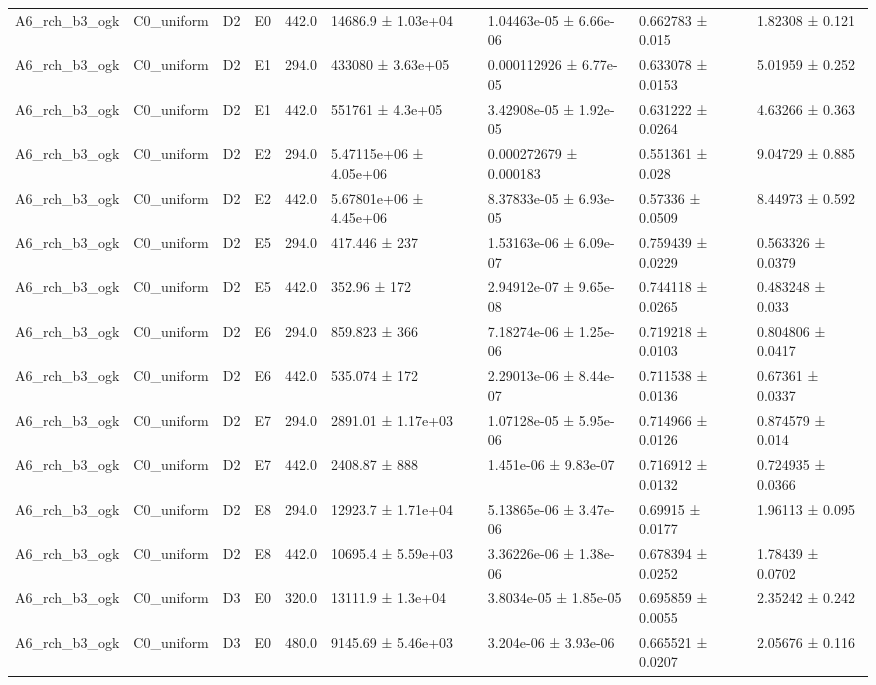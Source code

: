 \begin{table}
\begin{tabular}{lllllllll}
A6\_rch\_b3\_ogk & C0\_uniform & D2 & E0 & 442.0 & 14686.9 ± 1.03e+04 & 1.04463e-05 ± 6.66e-06 & 0.662783 ± 0.015 & 1.82308 ± 0.121 \\
A6\_rch\_b3\_ogk & C0\_uniform & D2 & E1 & 294.0 & 433080 ± 3.63e+05 & 0.000112926 ± 6.77e-05 & 0.633078 ± 0.0153 & 5.01959 ± 0.252 \\
A6\_rch\_b3\_ogk & C0\_uniform & D2 & E1 & 442.0 & 551761 ± 4.3e+05 & 3.42908e-05 ± 1.92e-05 & 0.631222 ± 0.0264 & 4.63266 ± 0.363 \\
A6\_rch\_b3\_ogk & C0\_uniform & D2 & E2 & 294.0 & 5.47115e+06 ± 4.05e+06 & 0.000272679 ± 0.000183 & 0.551361 ± 0.028 & 9.04729 ± 0.885 \\
A6\_rch\_b3\_ogk & C0\_uniform & D2 & E2 & 442.0 & 5.67801e+06 ± 4.45e+06 & 8.37833e-05 ± 6.93e-05 & 0.57336 ± 0.0509 & 8.44973 ± 0.592 \\
A6\_rch\_b3\_ogk & C0\_uniform & D2 & E5 & 294.0 & 417.446 ± 237 & 1.53163e-06 ± 6.09e-07 & 0.759439 ± 0.0229 & 0.563326 ± 0.0379 \\
A6\_rch\_b3\_ogk & C0\_uniform & D2 & E5 & 442.0 & 352.96 ± 172 & 2.94912e-07 ± 9.65e-08 & 0.744118 ± 0.0265 & 0.483248 ± 0.033 \\
A6\_rch\_b3\_ogk & C0\_uniform & D2 & E6 & 294.0 & 859.823 ± 366 & 7.18274e-06 ± 1.25e-06 & 0.719218 ± 0.0103 & 0.804806 ± 0.0417 \\
A6\_rch\_b3\_ogk & C0\_uniform & D2 & E6 & 442.0 & 535.074 ± 172 & 2.29013e-06 ± 8.44e-07 & 0.711538 ± 0.0136 & 0.67361 ± 0.0337 \\
A6\_rch\_b3\_ogk & C0\_uniform & D2 & E7 & 294.0 & 2891.01 ± 1.17e+03 & 1.07128e-05 ± 5.95e-06 & 0.714966 ± 0.0126 & 0.874579 ± 0.014 \\
A6\_rch\_b3\_ogk & C0\_uniform & D2 & E7 & 442.0 & 2408.87 ± 888 & 1.451e-06 ± 9.83e-07 & 0.716912 ± 0.0132 & 0.724935 ± 0.0366 \\
A6\_rch\_b3\_ogk & C0\_uniform & D2 & E8 & 294.0 & 12923.7 ± 1.71e+04 & 5.13865e-06 ± 3.47e-06 & 0.69915 ± 0.0177 & 1.96113 ± 0.095 \\
A6\_rch\_b3\_ogk & C0\_uniform & D2 & E8 & 442.0 & 10695.4 ± 5.59e+03 & 3.36226e-06 ± 1.38e-06 & 0.678394 ± 0.0252 & 1.78439 ± 0.0702 \\
A6\_rch\_b3\_ogk & C0\_uniform & D3 & E0 & 320.0 & 13111.9 ± 1.3e+04 & 3.8034e-05 ± 1.85e-05 & 0.695859 ± 0.0055 & 2.35242 ± 0.242 \\
A6\_rch\_b3\_ogk & C0\_uniform & D3 & E0 & 480.0 & 9145.69 ± 5.46e+03 & 3.204e-06 ± 3.93e-06 & 0.665521 ± 0.0207 & 2.05676 ± 0.116 \\

\end{tabular}
\end{table}
